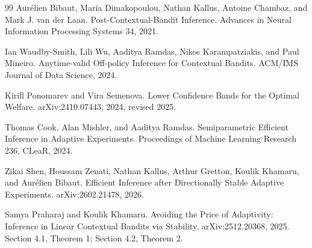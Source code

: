 \documentclass{article}
\begin{document}
\begin{thebibliography}{99}
   Aurélien Bibaut, Maria Dimakopoulou, Nathan Kallus, Antoine Chambaz, and Mark J. van der Laan. Post-Contextual-Bandit Inference. Advances in Neural Information Processing Systems 34, 2021.

   Ian Waudby-Smith, Lili Wu, Aaditya Ramdas, Nikos Karampatziakis, and Paul Mineiro. Anytime-valid Off-policy Inference for Contextual Bandits. ACM/IMS Journal of Data Science, 2024.

   Kirill Ponomarev and Vira Semenova. Lower Confidence Bands for the Optimal Welfare. arXiv:2410.07443, 2024, revised 2025.

   Thomas Cook, Alan Mishler, and Aaditya Ramdas. Semiparametric Efficient Inference in Adaptive Experiments. Proceedings of Machine Learning Research 236, CLeaR, 2024.

   Zikai Shen, Houssam Zenati, Nathan Kallus, Arthur Gretton, Koulik Khamaru, and Aurélien Bibaut. Efficient Inference after Directionally Stable Adaptive Experiments. arXiv:2602.21478, 2026.

   Samya Praharaj and Koulik Khamaru. Avoiding the Price of Adaptivity: Inference in Linear Contextual Bandits via Stability. arXiv:2512.20368, 2025. Section 4.1, Theorem 1; Section 4.2, Theorem 2.

\end{thebibliography}
\end{document}

